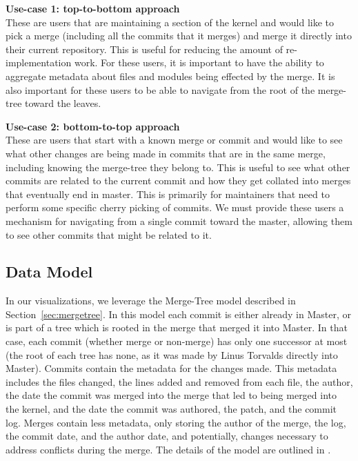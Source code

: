\documentclass[conference, draftclsnofoot, draft]{IEEEtran}
\begin{document}
\noindent \textbf{Use-case 1: top-to-bottom approach}\label{sec:usecase1}\\
These are users that are maintaining a section of the kernel and would like to pick
a merge (including all the commits that it merges) and merge it directly into their current repository. This is useful for
reducing the amount of re-implementation work. For these users, it is important to have the
ability to aggregate metadata about files and modules being effected by the merge.
It is also important for these users to be able to navigate from the root of the merge-tree toward the
leaves.

\noindent \textbf{Use-case 2: bottom-to-top approach}\label{sec:usecase2}\\
These are users that start with a known merge or commit and would like to see what
other changes are being made in commits that are in the same merge, including knowing the merge-tree they belong to. This is useful
to see what other commits are related to the current commit and how they get collated into merges that eventually end in master.
 This is primarily for maintainers that need to perform
some specific cherry picking of commits. We
must provide these users a mechanism for navigating from a single commit toward the
master, allowing them to see other commits that might be related to it.

\subsection{Data Model}

In our visualizations, we leverage the Merge-Tree model described in Section~\ref{sec:mergetree}. In this model each commit is either already in Master, or is part of a tree which is rooted in the merge that merged it into Master. In that case, each
commit (whether merge or non-merge) has only one successor at most (the root of each tree has none, as it was made by Linus Torvalds directly into Master).
Commits contain the
metadata for the changes made. This metadata includes the files changed, the lines
added and removed from each file, the author, the date the commit was merged into
the merge that led to being merged into the kernel, and the date the commit was
authored, the patch, and the commit log. Merges contain less metadata, only storing
the author of the merge, the log, the commit date, and the author date, and potentially, changes necessary to address conflicts during the merge. The details
of the model are outlined in \cite{German2015}.
\end{document}
